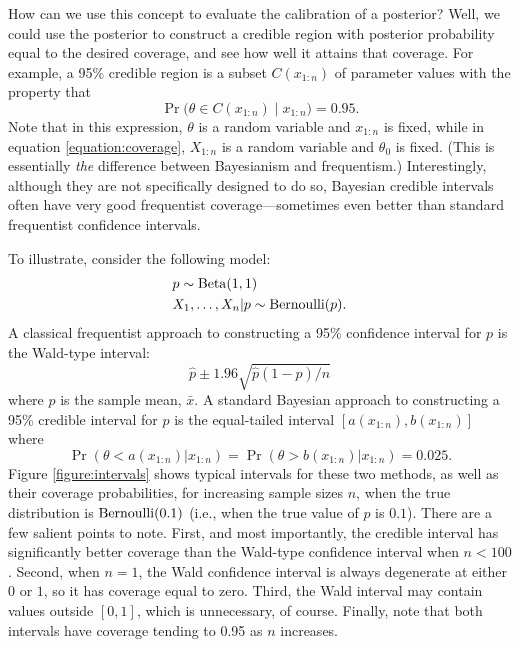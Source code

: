 \documentclass[12pt]{article}
\begin{document}
How can we use this concept to evaluate the calibration of a posterior? Well, we could use the posterior to construct a credible region with posterior probability equal to the desired coverage, and see how well it attains that coverage. For example, a 95\% credible region is a subset $C(x_{1:n})$ of parameter values with the property that 
$$ \Pr\big(\theta \in C(x_{1:n}) \;\big\vert\; x_{1:n}) = 0.95. $$
Note that in this expression, $\theta$ is a random variable and $x_{1:n}$ is fixed, while in equation \ref{equation:coverage}, $X_{1:n}$ is a random variable and $\theta_0$ is fixed. (This is essentially \textit{the} difference between Bayesianism and frequentism.)
Interestingly, although they are not specifically designed to do so, Bayesian credible intervals often have very good frequentist coverage---sometimes even better than standard frequentist confidence intervals. 

To illustrate, consider the following model:
\begin{align*}
& p \sim \operatorname*{Beta}(1,1)\\
& X_1,\ldots,X_n | p \sim \operatorname*{Bernoulli}(p).
\end{align*}
A classical frequentist approach to constructing a 95\% confidence interval for $p$ is the Wald-type interval:
$$ \hat p \pm 1.96 \sqrt{\hat p (1-\hat p) / n}$$
where $\hat p$ is the sample mean, $\bar x$. A standard Bayesian approach to constructing a 95\% credible interval for $p$ is the equal-tailed interval $[a(x_{1:n}),b(x_{1:n})]$ where 
$$ \Pr(\theta<a(x_{1:n}) | x_{1:n}) = \Pr(\theta>b(x_{1:n}) | x_{1:n}) = 0.025. $$
Figure \ref{figure:intervals} shows typical intervals for these two methods, as well as their coverage probabilities, for increasing sample sizes $n$, when the true distribution is $\operatorname*{Bernoulli}(0.1)$ (i.e., when the true value of $p$ is $0.1$).  There are a few salient points to note. First, and most importantly, the credible interval has significantly better coverage than the Wald-type confidence interval when $n < 100$. Second, when $n = 1$, the Wald confidence interval is always degenerate at either $0$ or $1$, so it has coverage equal to zero. Third, the Wald interval may contain values outside $[0,1]$, which is unnecessary, of course. Finally, note that both intervals have coverage tending to 0.95 as $n$ increases.
\end{document}
